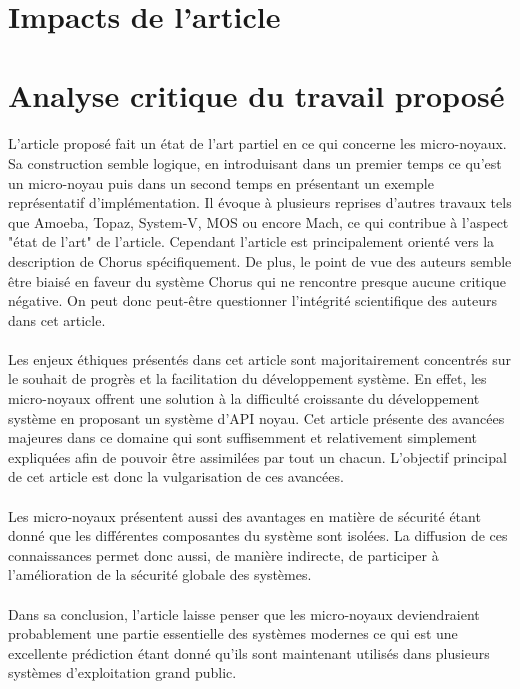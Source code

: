 \documentclass[a4paper, 12pt]{article}
\begin{document}
\clearpage 
\section{Impacts de l'article}

\clearpage 
\section{Analyse critique du travail proposé}
\paragraph{}
L'article proposé fait un état de l'art partiel en ce qui concerne les micro-noyaux. Sa construction semble logique, en introduisant dans un premier temps ce qu'est un micro-noyau puis dans un second temps en présentant un exemple représentatif d'implémentation. Il évoque à plusieurs reprises d'autres travaux tels que Amoeba, Topaz, System-V, MOS ou encore  Mach, ce qui contribue à l'aspect "état de l'art" de l'article. Cependant l'article est principalement orienté vers la description de Chorus spécifiquement. De plus, le point de vue des auteurs semble être biaisé en faveur du système Chorus qui ne rencontre presque aucune critique négative. On peut donc peut-être questionner l'intégrité scientifique des auteurs dans cet article.
\paragraph{}
Les enjeux éthiques présentés dans cet article sont majoritairement concentrés sur le souhait de progrès et la facilitation du développement système. En effet, les micro-noyaux offrent une solution à la difficulté croissante du développement système en proposant un système d'API noyau. Cet article présente des avancées majeures dans ce domaine qui sont suffisemment et relativement simplement expliquées afin de pouvoir être assimilées par tout un chacun. L'objectif principal de cet article est donc la vulgarisation de ces avancées. \paragraph{}
Les micro-noyaux présentent aussi des avantages en matière de sécurité étant donné que les différentes composantes du système sont isolées. La diffusion de ces connaissances permet donc aussi, de manière indirecte, de participer à l'amélioration de la sécurité globale des systèmes.
\paragraph{}
Dans sa conclusion, l'article laisse penser que les micro-noyaux deviendraient probablement une partie essentielle des systèmes modernes ce qui est une excellente prédiction étant donné qu'ils sont maintenant utilisés dans plusieurs systèmes d'exploitation grand public.
\end{document}
